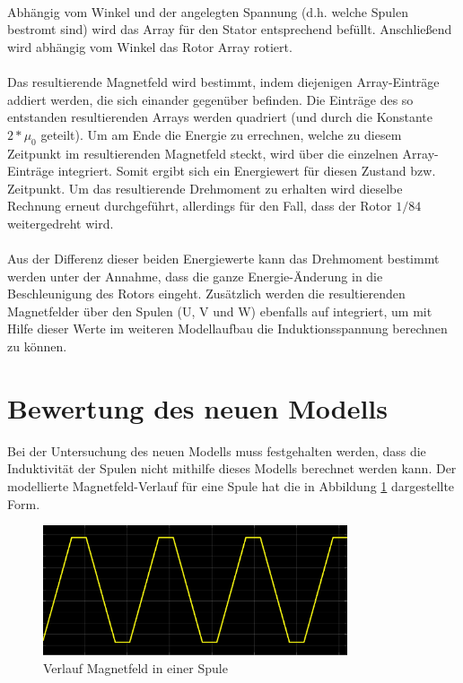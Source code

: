 \paragraph{}
Abhängig vom Winkel und der angelegten Spannung (d.h. welche Spulen bestromt sind) wird das Array für den Stator entsprechend befüllt. 
Anschließend wird abhängig vom Winkel das Rotor Array rotiert. 

\paragraph{}
Das resultierende Magnetfeld wird bestimmt, indem diejenigen Array-Einträge addiert werden, die sich einander gegenüber befinden. 
Die Einträge des so entstanden resultierenden Arrays werden quadriert (und durch die Konstante $2*\mu_0$ geteilt). 
Um am Ende die Energie zu errechnen, welche zu diesem Zeitpunkt im resultierenden Magnetfeld steckt, wird über die einzelnen Array-Einträge integriert. 
Somit ergibt sich ein Energiewert für diesen Zustand bzw. Zeitpunkt. 
Um das resultierende Drehmoment zu erhalten wird dieselbe Rechnung erneut durchgeführt, allerdings für den Fall, dass der Rotor $1/84$ weitergedreht wird. 

\paragraph{}
Aus der Differenz dieser beiden Energiewerte kann das Drehmoment bestimmt werden unter der Annahme, dass die ganze Energie-Änderung in die Beschleunigung des Rotors eingeht.
Zusätzlich werden die resultierenden Magnetfelder über den Spulen (U, V und W) ebenfalls auf integriert, um mit Hilfe dieser Werte im weiteren Modellaufbau die Induktionsspannung berechnen zu können.

\section{Bewertung des neuen Modells}
Bei der Untersuchung des neuen Modells muss festgehalten werden, dass die Induktivität der Spulen nicht mithilfe dieses Modells berechnet werden kann. 
Der modellierte Magnetfeld-Verlauf für eine Spule hat die in Abbildung \ref{FigResultierendesFeld}
dargestellte Form.

\begin{figure}[htbp]
	\centering
	\includegraphics[width=0.8\textwidth]{./sim/pictures/resultierendesFeld.png}
	\caption{Verlauf Magnetfeld in einer Spule}
	\label{FigResultierendesFeld}
\end{figure}

